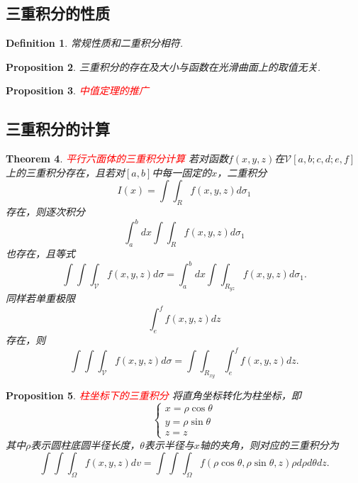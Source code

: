 \documentclass{article}
\newtheorem{theorem}{Theorem}[section]
\newtheorem{proposition}[theorem]{Proposition}
\newtheorem{definition}[theorem]{Definition}
\newcommand{\redt}[1]{\textcolor{red}{#1}}
\begin{document}
\subsection{三重积分的性质}

\begin{definition}
\rm 常规性质和二重积分相符.
\end{definition}

\begin{proposition}
\rm 三重积分的存在及大小与函数在光滑曲面上的取值无关. 
\end{proposition}

\begin{proposition}
\rm \redt{中值定理的推广}
\end{proposition}

\subsection{三重积分的计算}

\begin{theorem}
\rm \redt{平行六面体的三重积分计算} 若对函数$f(x,y,z)$在$\mathcal{V}[a,b;c,d;e,f]$上的三重积分存在，且若对$[a,b]$中每一固定的$x$，二重积分
$$
I(x) = \int\int_{R}f(x,y,z)d\sigma_1
$$
存在，则逐次积分
$$
\int_a^b dx \int\int_{R}f(x,y,z)d\sigma_1
$$
也存在，且等式
$$
\int\int\int_{\mathcal{V}} f(x,y,z)d\sigma = \int_a^b dx \int\int_{R_{yz}}f(x,y,z)d\sigma_1.
$$
同样若单重极限
$$
\int_e^f f(x,y,z)dz
$$
存在，则
$$
\int\int\int_{\mathcal{V}} f(x,y,z)d\sigma = \int\int_{R_{xy}}\int_e^f f(x,y,z)dz.
$$
\end{theorem}

\begin{proposition}
\rm \redt{柱坐标下的三重积分} 将直角坐标转化为柱坐标，即
$$
\left\{
\begin{array}{ll}
x = \rho\cos\theta \\
y = \rho\sin\theta \\
z = z
\end{array}\right.
$$
其中$\rho$表示圆柱底圆半径长度，$\theta$表示半径与$x$轴的夹角，则对应的三重积分为
$$
\int\int\int_{\Omega}f(x,y,z)dv = \int\int\int_{\Omega} f(\rho\cos\theta,\rho\sin\theta,z)\rho d\rho d\theta dz.  
$$
\end{proposition}
\end{document}
